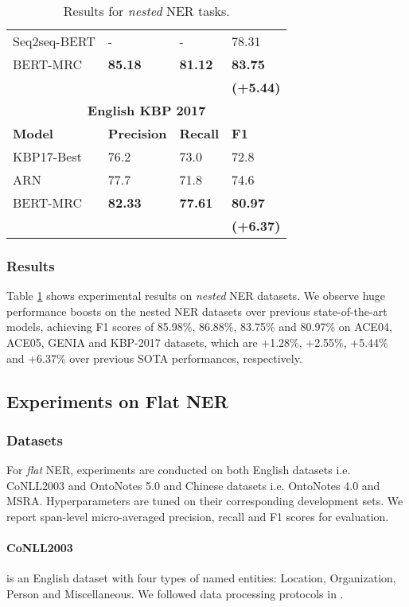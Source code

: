 \documentclass[11pt,a4paper]{article}
\begin{document}
\begin{table}
{\begin{tabular}{llll}
Seq2seq-BERT \cite{strakova2019nested} & - &- &  78.31 \\ 
BERT-MRC& {\bf 85.18} & {\bf 81.12} & {\bf 83.75} \\
&  & & {\bf (+5.44)}\\
\bottomrule 
\multicolumn{4}{c}{{\bf English KBP 2017}}\\
\midrule 
{\bf Model} & {\bf Precision} & {\bf Recall} & {\bf F1} \\
\midrule 
KBP17-Best \cite{heng2017kbp} & 76.2 & 73.0 & 72.8 \\
ARN \cite{nugget2019nested} & 77.7 & 71.8 & 74.6 \\
BERT-MRC& {\bf 82.33} & {\bf 77.61} & {\bf 80.97} \\
&  &  & {\bf (+6.37)}\\
\bottomrule \hline
\end{tabular}
}
\caption{Results for {\em nested} NER tasks.}
\label{nested NER results}
\end{table}

\subsubsection{Results} 
Table \ref{nested NER results} shows  experimental results on {\em nested} NER datasets. 
We observe huge performance boosts on the nested NER datasets over previous state-of-the-art models, achieving F1 scores of 
85.98\%, 86.88\%, 83.75\% and 80.97\% on ACE04, ACE05, GENIA and KBP-2017 datasets, which are 
+1.28\%, +2.55\%, +5.44\% and +6.37\% over previous SOTA performances, respectively. 



\subsection{Experiments on Flat NER}



\subsubsection{Datasets}
For {\em flat} NER, experiments are conducted on both English datasets i.e. CoNLL2003 and OntoNotes 5.0 and Chinese datasets i.e. OntoNotes 4.0 and MSRA. 
Hyperparameters are tuned on their corresponding development sets.
We  report span-level micro-averaged precision, recall and F1 scores for evaluation. 

\paragraph{CoNLL2003} \cite{conll2003ner} is an English dataset with four types of named entities: Location, Organization, Person and Miscellaneous. 
We followed data processing protocols in .
\end{document}
